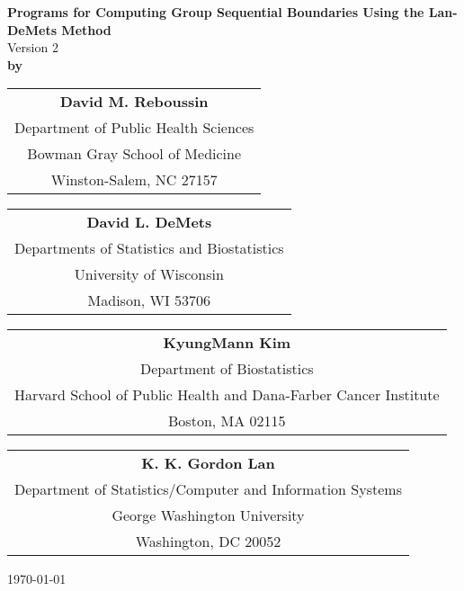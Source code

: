 \setlength{\oddsidemargin}{0in}
\setlength{\textwidth}{6.5in}
\setlength{\topmargin}{-0.5in}
\setlength{\textheight}{9in}


\vspace*{2cm}
  \begin{center}
    {\Large \bf Programs for Computing Group Sequential Boundaries Using
    the Lan-DeMets Method} \\[2ex]
        {\large Version 2} \\[2ex]
           {\bf by} \\[2ex]

      \begin{tabular}{c}
        {\large \bf David M. Reboussin} \\
        Department of Public Health Sciences \\
        Bowman Gray School of Medicine       \\
        Winston-Salem, NC 27157             \\
      \end{tabular}

\vspace{.5cm}
      \begin{tabular}{c}
        {\large \bf David L. DeMets}    \\
        Departments of Statistics and Biostatistics      \\
        University of Wisconsin          \\
        Madison, WI 53706                \\
      \end{tabular}

\vspace{.5cm}
      \begin{tabular}{c}
        {\large \bf KyungMann Kim}       \\
        Department of Biostatistics      \\
        Harvard School of Public Health
        and Dana-Farber Cancer Institute   \\
        Boston, MA 02115              \\
      \end{tabular}

\vspace{.5cm}
      \begin{tabular}{c}
        {\large \bf K. K. Gordon Lan}  \\
        Department of Statistics/Computer and Information Systems \\
        George Washington University \\
        Washington, DC 20052          \\
      \end{tabular}

\vspace{.5cm}
\today
\end{center}


